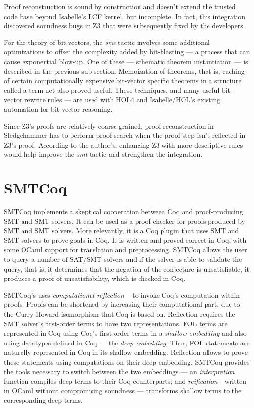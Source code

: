 \documentclass{article}
\begin{document}
		Proof reconstruction is sound by construction 
		and doesn't extend the trusted code base
		beyond Isabelle's LCF kernel, but incomplete. 
		In fact, this integration discovered soundness
		bugs in Z3 that were subsequently fixed by the 
		developers.
		
		For the theory of bit-vectors, the \textit{smt}
		tactic involves some additional optimizations 
		to offset the complexity added by bit-blasting --- 
		a process that can cause exponential blow-up. 
		One of these --- schematic theorem instantiation --- 
		is described in the previous sub-section. 
		Memoization of theorems, that is, caching of 
		certain computationally expensive bit-vector 
		specific theorems in a structure called a term net 
		also proved useful. These techniques, and many 
		useful bit-vector rewrite rules --- are used 
		with HOL4 and Isabelle/HOL's existing automation
		for bit-vector reasoning.
		
		Since Z3's proofs are relatively coarse-grained,
		proof reconstruction in Sledgehammer has to perform
		proof search when the proof step isn't reflected 
		in Z3's proof. According to the author's, 
		enhancing Z3 with more descriptive rules would 
		help improve the \textit{smt} tactic and strengthen 
		the integration.
		
\section{SMTCoq}
\label{sec:cert}
	SMTCoq implements a skeptical cooperation between 
	Coq and proof-producing SMT  and SMT solvers. 
	It can be used as a proof checker for proofs 
	produced by SMT  and SMT solvers. More relevantly, 
	it is a Coq plugin that uses SMT  and SMT solvers to 
	prove goals in Coq. It is written and proved 
	correct in Coq, with some OCaml support for 
	translation and preprocessing. SMTCoq allows 
	the user to query a number of SAT/SMT solvers 
	and if the solver is able to validate the query, 
	that is, it determines that the negation of the 
	conjecture is unsatisfiable, it produces a proof 
	of unsatisfiability, which is checked in Coq.
	
	SMTCoq's uses \textit{computational reflection}
	~\cite{113737} to invoke Coq's computation within 
	proofs. Proofs can be shortened by increasing 
	their computational	part, due to the 
	Curry-Howard isomorphism that Coq is based on. 
	Reflection requires the SMT solver's first-order
	terms to have two representations. FOL terms are 
	represented in Coq using Coq's first-order 
	terms in a \textit{shallow embedding} and also 
	using datatypes defined in Coq --- the 
	\textit{deep embedding}. Thus, FOL statements 
	are naturally represented in Coq in its 
	shallow embedding. Reflection allows to 
	prove these statements using computations 
	on their deep embedding. SMTCoq provides 
	the tools necessary to switch between the 
	two embeddings --- an \textit{interpretion} 
	function compiles deep terms to their Coq 
	counterparts; and \textit{reification} 
	- written in OCaml without compromising 
	soundness --- transforms shallow terms to the 
	corresponding deep terms.
	
\end{document}
